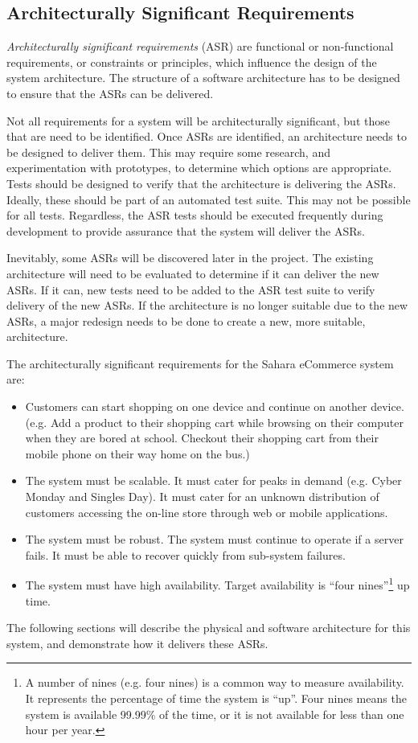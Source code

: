 \subsection{Architecturally Significant Requirements}\label{sec:storeReq}
\emph{Architecturally significant requirements} (ASR) are functional or non-functional requirements,
or constraints or principles, which influence the design of the system architecture.
The structure of a software architecture has to be designed to ensure that the ASRs can be delivered.

Not all requirements for a system will be architecturally significant, but those that are need to be identified.
Once ASRs are identified, an architecture needs to be designed to deliver them.
This may require some research, and experimentation with prototypes, to determine which options are appropriate.
Tests should be designed to verify that the architecture is delivering the ASRs.
Ideally, these should be part of an automated test suite.
This may not be possible for all tests.
Regardless, the ASR tests should be executed frequently during development to provide assurance that the system will deliver the ASRs.

Inevitably, some ASRs will be discovered later in the project.
The existing architecture will need to be evaluated to determine if it can deliver the new ASRs.
If it can, new tests need to be added to the ASR test suite to verify delivery of the new ASRs.
If the architecture is no longer suitable due to the new ASRs,
a major redesign needs to be done to create a new, more suitable, architecture.

The architecturally significant requirements for the Sahara eCommerce system are:
\begin{itemize}
    \item Customers can start shopping on one device and continue on another device.
             (e.g. Add a product to their shopping cart while browsing on their computer when they are bored at school.
              Checkout their shopping cart from their mobile phone on their way home on the bus.)
    \item The system must be scalable. It must cater for peaks in demand (e.g. Cyber Monday and Singles Day).
             It must cater for an unknown distribution of customers accessing the on-line store through web or mobile applications.
    \item The system must be robust. The system must continue to operate if a server fails.
             It must be able to recover quickly from sub-system failures.
    \item The system must have high availability.
             Target availability is ``four nines''\footnote{A number of nines (e.g. four nines)
             is a common way to measure availability. It represents the percentage of time the system is ``up''.
             Four nines means the system is available 99.99\% of the time, or it is not available for less than one hour per year.}
            up time.
\end{itemize}
\noindent
The following sections will describe the physical and software architecture for this system, and demonstrate how it delivers these ASRs.

